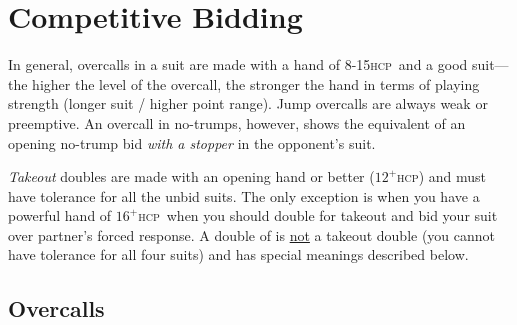 \documentclass[a4paper,article,oneside]{memoir}
\newcommand{\hcp}{\textsc{hcp}}
\begin{document}
\pagebreak

\section{Competitive Bidding}

In general, overcalls in a suit are made with a hand of 8-15\hcp\ and
a good suit---the higher the level of the overcall, the stronger the
hand in terms of playing strength (longer suit / higher point
range). Jump overcalls are always weak or preemptive. An overcall in
no-trumps, however, shows the equivalent of an opening no-trump bid
\emph{with a stopper} in the opponent's suit.

\emph{Takeout} doubles are made with an opening hand or better
($12^+$\hcp) and must have tolerance for all the unbid suits. The only
exception is when you have a powerful hand of $16^+$\hcp\ when you
should double for takeout and bid your suit over partner's forced
response. A double of  is \underline{not} a takeout double (you
cannot have tolerance for all four suits) and has special meanings
described below.

\subsection{Overcalls}
\end{document}
